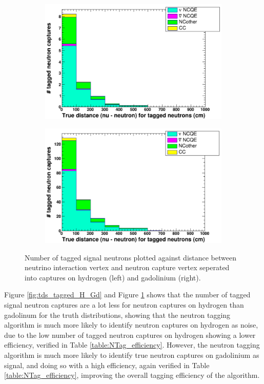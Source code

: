 \begin{figure}
    \centering
     \begin{subfigure}[b]{0.49\linewidth}
      \includegraphics[width=\linewidth]{Figures/distposvtrunvx_tagged_neutrons_H.PNG}
     \end{subfigure}
     \begin{subfigure}[b]{0.49\linewidth}
       \includegraphics[width=\linewidth]{Figures/distposvtrunvx_tagged_neutrons_Gd.PNG}
      \end{subfigure} 
      \caption{Number of tagged signal neutrons plotted against distance between neutrino interaction vertex and neutron capture vertex seperated into captures on hydrogen (left) and gadolinium (right).}
      \label{fig:distposvtrunvx_tagged_H_Gd} 
\end{figure}

Figure \ref{fig:tds_tagged_H_Gd} and Figure \ref{fig:distposvtrunvx_tagged_H_Gd} shows that the number of tagged signal neutron captures are a lot less for neutron captures on hydrogen than gadolinum for the truth distributions, showing that the neutron tagging algorithm is much more likely to identify neutron captures on hydrogen as noise, due to the low number of tagged neutron captures on hydrogen showing a lower efficiency, verified in Table \ref{table:NTag_efficiency}. However, the neutron tagging algorithm is much more likely to identify true neutron captures on gadolinium as signal, and doing so with a high efficiency, again verified in Table \ref{table:NTag_efficiency}, improving the overall tagging efficiency of the algorithm. 

